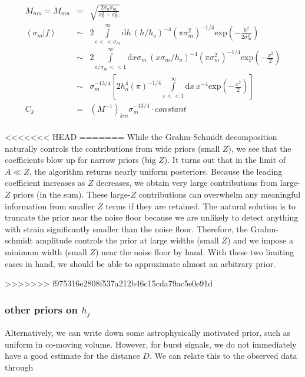 \documentclass[10pt]{article}
\begin{document}
\begin{eqnarray}
M_{nm} = M_{mn} & = & \sqrt{\frac{2\sigma_n\sigma_m}{\sigma_n^2+\sigma_m^2}} \\
\left<\sigma_m|f\right> & \sim & 2\int\limits_{\epsilon << \sigma_m}^{\infty}\mathrm{d}h\, \left(h/h_o\right)^{-4} \left(\pi \sigma_m^2\right)^{-1/4} \mathrm{exp}\left(-\frac{h^2}{2\sigma_m^2} \right) \\
                        & \sim & 2\int\limits_{\epsilon/\sigma_m << 1}^{\infty}\mathrm{d}x\sigma_m\, \left(x\sigma_m/h_o\right)^{-4} \left(\pi \sigma_m^2\right)^{-1/4} \mathrm{exp}\left(-\frac{x^2}{2} \right) \\
                        & \sim & \sigma_m^{-13/4} \left[ 2 h_o^{4}(\pi)^{-1/4}\int\limits_{\varepsilon << 1}^{\infty}\mathrm{d}x\, x^{-4} \mathrm{exp}\left(-\frac{x^2}{2} \right) \right]\\
C_k & = & \left(M^{-1}\right)_{km} \sigma_m^{-13/4}\cdot constant\\
\end{eqnarray}

<<<<<<< HEAD
=======
While the Grahm-Schmidt decomposition naturally controls the contributions from wide priors (small $Z$), we see that the coefficients blow up for narrow priors (big $Z$). It turns out that in the limit of $A\ll Z$, the algorithm returns nearly uniform posteriors. Because the leading coefficient increases as $Z$ decreases, we obtain very large contributions from large-$Z$ priors (in the sum). These large-$Z$ contributions can overwhelm any meaningful information from smaller $Z$ terms if they are retained. The natural solution is to truncate the prior near the noise floor because we are unlikely to detect anything with strain significantly smaller than the noise floor. Therefore, the Grahm-schmidt amplitude controls the prior at large widths (small $Z$) and we impose a minimum width (small $Z$) near the noise floor by hand. With these two limiting cases in hand, we should be able to approximate almost an arbitrary prior.

>>>>>>> f975316e2808f537a212b46c15cda79ac5e0e91d
\subsubsection{other priors on $h_j$}

Alternatively, we can write down some astrophysically motivated prior, such as uniform in co-moving volume. However, for burst signals, we do not immediately have a good estimate for the distance $D$. We can relate this to the observed data through
\end{document}
